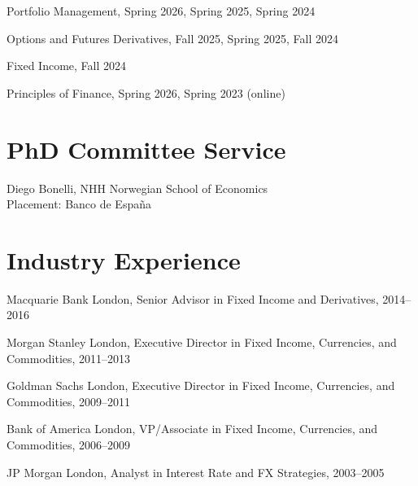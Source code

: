 \documentclass[11pt]{article}
\begin{document}
Portfolio Management, Spring 2026, Spring 2025, Spring 2024

Options and Futures Derivatives, Fall 2025, Spring 2025, Fall 2024

Fixed Income, Fall 2024

Principles of Finance, Spring 2026, Spring 2023 (online)

\section{PhD Committee Service}
Diego Bonelli, NHH Norwegian School of Economics\\
\hspace*{1.5em}Placement: Banco de Espa\~na

\section{Industry Experience}
Macquarie Bank London, Senior Advisor in Fixed Income and Derivatives, 2014--2016

Morgan Stanley London, Executive Director in Fixed Income, Currencies, and Commodities, 2011--2013

Goldman Sachs London, Executive Director in Fixed Income, Currencies, and Commodities, 2009--2011

Bank of America London, VP/Associate in Fixed Income, Currencies, and Commodities, 2006--2009

JP Morgan London, Analyst in Interest Rate and FX Strategies, 2003--2005
\end{document}
